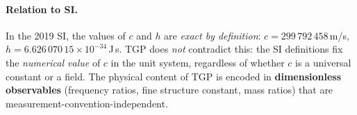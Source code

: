 \paragraph{Relation to SI.}
In the 2019 SI, the values of $c$ and $h$ are \emph{exact by definition}:
$c = 299\,792\,458$\,m/s, $h = 6.626\,070\,15 \times 10^{-34}$\,J\,s.
TGP does \emph{not} contradict this: the SI definitions fix the
\emph{numerical value} of $c$ in the unit system, regardless of whether
$c$ is a universal constant or a field.  The physical content of TGP
is encoded in \textbf{dimensionless observables} (frequency ratios,
fine structure constant, mass ratios) that are measurement-convention-independent.
